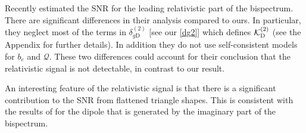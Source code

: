 Recently \cite{Jeong:2019igb} estimated the  SNR for the leading relativistic part of the bispectrum.  There are significant differences in their analysis compared to ours. In particular, they neglect most of the terms in $\delta_{g \mathrm{D}}^{(2)}$ [see our \eqref{dg2}] which defines ${\cal K}^{(2)}_{\mathrm{D}}$ (see the Appendix for further details). {In addition they do not use self-consistent models for $b_{e}$ and $\mathcal{Q}$. These two differences could account for their conclusion that the relativistic signal is not detectable, in contrast to our result.} 

An interesting feature of the relativistic signal is that there is a significant contribution to the SNR from  flattened triangle shapes. This is consistent with the results of  \cite{Clarkson:2018dwn} for the dipole that is generated by the imaginary part of the bispectrum.
%
%
